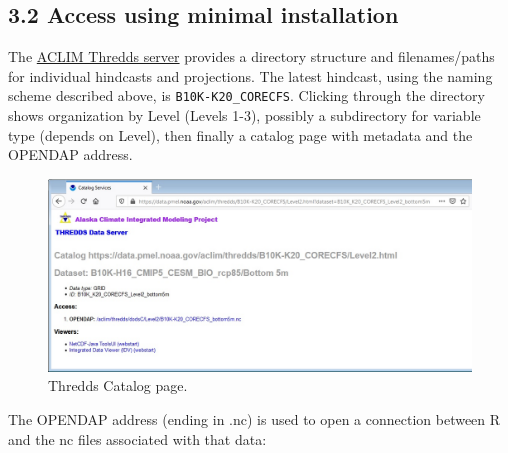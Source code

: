 \documentclass[
]{article}
\begin{document}
\hypertarget{access-using-minimal-installation}{%
\subsection{3.2 Access using minimal
installation}\label{access-using-minimal-installation}}

The \href{https://data.pmel.noaa.gov/aclim/thredds/}{ACLIM Thredds
server} provides a directory structure and filenames/paths for
individual hindcasts and projections. The latest hindcast, using the
naming scheme described above, is \texttt{B10K-K20\_CORECFS}. Clicking
through the directory shows organization by Level (Levels 1-3), possibly
a subdirectory for variable type (depends on Level), then finally a
catalog page with metadata and the OPENDAP address.

\begin{figure}
\centering
\includegraphics[width=1\textwidth,height=\textheight]{Figs/catalog.jpg}
\caption{Thredds Catalog page.}
\end{figure}

The OPENDAP address (ending in .nc) is used to open a connection between
R and the nc files associated with that data:
\end{document}
